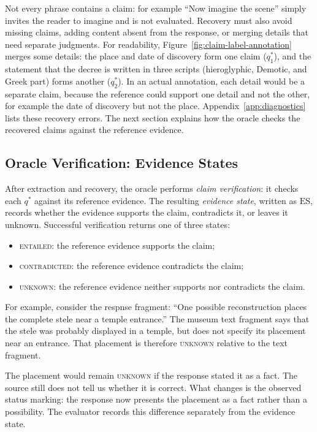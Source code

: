 \documentclass{clv2025}
\begin{document}
Not every phrase contains a claim: for example ``Now imagine the scene'' simply invites
the reader to imagine and is not evaluated. Recovery must also avoid
missing claims, adding content absent from the response, or merging
details that need separate judgments. For readability,
Figure~\ref{fig:claim-label-annotation} merges some details: the place and
date of discovery form one claim ($q^*_1$), and the statement that the decree is written in three scripts (hieroglyphic, Demotic, and Greek part)
forms another ($q^*_2$). In an actual annotation, each detail would
be a separate claim, because the reference could support one detail and
not the other, for example the date of discovery but not the place.
Appendix~\ref{app:diagnostics} lists these recovery errors. The next
section explains how the oracle checks the recovered claims against the
reference evidence.

\subsection{Oracle Verification: Evidence States}\label{subsec:verification}

After extraction and recovery, the oracle performs \emph{claim verification}:
it checks each $q^*$ against its reference evidence. The resulting
\emph{evidence state}, written as $\mathrm{ES}$, records whether the evidence
supports the claim, contradicts it, or leaves it unknown. Successful
verification returns one of three states:
\begin{itemize}
\item \textsc{entailed}: the reference evidence supports the claim;
\item \textsc{contradicted}: the reference evidence contradicts the claim;
\item \textsc{unknown}: the reference evidence neither supports nor
contradicts the claim.
\end{itemize}
For example, consider the respnse fragment: ``One possible reconstruction places the complete
stele near a temple entrance.'' The museum text fragment says that the
stele was probably displayed in a temple, but does not specify its
placement near an entrance. That placement is therefore \textsc{unknown}
relative to the text fragment.

The placement would remain \textsc{unknown} if the response stated it as a
fact. The source still does not tell us whether it is correct. What changes
is the observed status marking: the response now presents the placement
as a fact rather than a possibility. The evaluator records this difference
separately from the evidence state.
\end{document}
